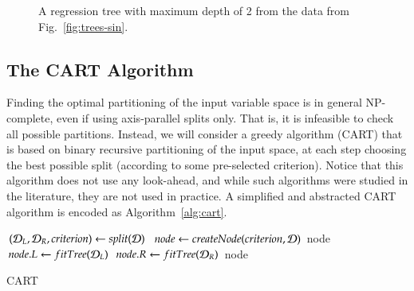 \begin{refsection}
\begin{figure}[htbp]
\caption{A regression tree with maximum depth of 2 from the data from Fig.~\ref{fig:trees-sin}.}
\label{fig:fig:trees-sin-2}
\end{figure}

\subsection*{The CART Algorithm}

Finding the optimal partitioning of the input variable space is in general NP-complete, even if using axis-parallel splits only. That is, it is infeasible to check all possible partitions. Instead, we will consider a greedy algorithm (CART) that is based on binary recursive partitioning of the input space, at each step choosing the best possible split (according to some pre-selected criterion). Notice that this algorithm does not use any look-ahead, and while such algorithms were studied in the literature, they are not used in practice. A simplified and abstracted CART algorithm is encoded as Algorithm~\ref{alg:cart}.

\begin{algorithm}
\begin{algorithmic}[1]
\State $(\mathcal{D}_L, \mathcal{D}_R, criterion) \gets split(\mathcal{D})$
\State $node \gets createNode(criterion, \mathcal{D})$
 \Return node \EndIf
\State $node.L \gets fitTree(\mathcal{D}_L)$
\State $node.R \gets fitTree(\mathcal{D}_R)$
\State \Return node
\EndProcedure
\end{algorithmic}
\caption{CART}\label{alg:cart}
\end{algorithm}


\end{refsection}
